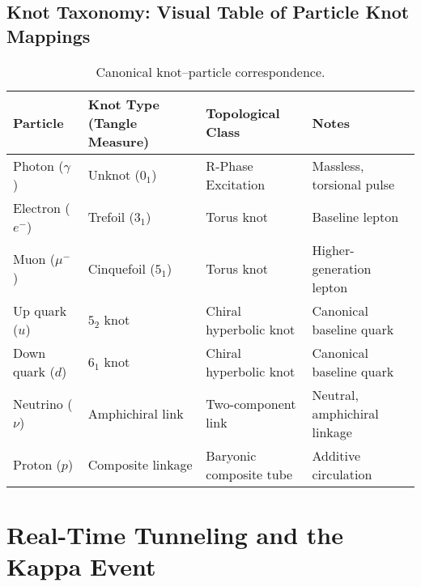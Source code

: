 \documentclass[10pt,reprint,aps,onecolumn,nofootinbib]{revtex4-2}
\begin{document}
    \subsection*{Knot Taxonomy: Visual Table of Particle Knot Mappings}
        \begin{table}[h!]\label{tab:knotetable}
            \centering
            \small
            \begin{adjustbox}{max width=\textwidth}
                \begin{tabular}{|l|l|l|l|}
                    \hline
                        \textbf{Particle} & \textbf{Knot Type (Tangle Measure)} & \textbf{Topological Class} & \textbf{Notes} \\
                    \hline
                        Photon ($\gamma$) & Unknot ($0_1$) & R-Phase Excitation & Massless, torsional pulse~ \cite{sstCanon, sstLagrangian} \\
                        Electron ($e^-$) & Trefoil ($3_1$) & Torus knot & Baseline lepton~ \cite{sstCanon, sstLagrangian} \\
                        Muon ($\mu^-$) & Cinquefoil ($5_1$) & Torus knot & Higher-generation lepton~ \cite{sstLagrangian} \\
                        Up quark ($u$) & $5_2$ knot & Chiral hyperbolic knot & Canonical baseline quark~ \cite{sstCanon, sstLagrangian} \\
                        Down quark ($d$) & $6_1$ knot & Chiral hyperbolic knot & Canonical baseline quark~ \cite{sstCanon, sstLagrangian4} \\
                        Neutrino ($\nu$) & Amphichiral link & Two-component link & Neutral, amphichiral linkage~ \cite{sstLagrangian} \\
                        Proton ($p$) & Composite linkage & Baryonic composite tube & Additive circulation~ \cite{chiralSwirl} \\
                    \hline
                \end{tabular}
            \end{adjustbox}
            \caption{Canonical knot–particle correspondence.}
        \end{table}


\section{Real-Time Tunneling and the Kappa Event}\label{sec:KappaTunneling}
\end{document}
